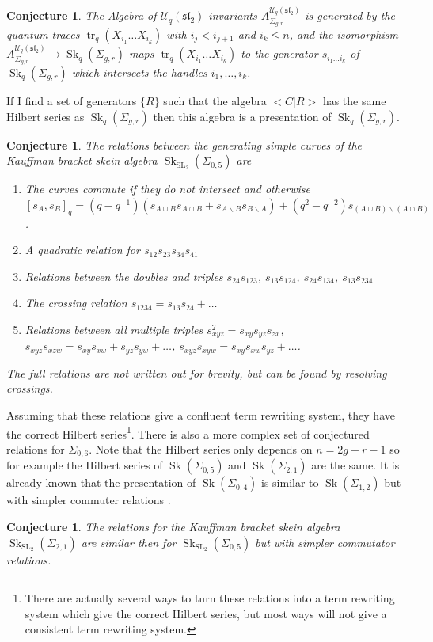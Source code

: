 \documentclass{article}
\newcommand{\Sk}{\operatorname{Sk}}
\newcommand{\SL}{\operatorname{SL}}
\newcommand{\slgroup}{\mathfrak{sl}}
\newcommand{\tr}{\operatorname{tr}_q}
\newtheorem{conj}[thm]{Conjecture}
\begin{document}
\begin{conj}
\label{conj:IsomorphismMapsTrace}
The Algebra of $\mathcal{U}_q(\slgroup_2)$-invariants $A_{\Sigma_{g,r}}^{\mathcal{U}_q(\slgroup_2)}$ is generated by the quantum traces $\tr(X_{i_1} \dots X_{i_k})$ with $i_{j} < i_{j+1}$ and $i_k \leq n$, and  the isomorphism $A_{\Sigma_{g,r}}^{\mathcal{U}_q(\slgroup_2)} \to \Sk_q(\Sigma_{g,r})$ maps $\tr(X_{i_1} \dots X_{i_k})$ to the generator $s_{i_1 \dots i_k}$ of $\Sk_q(\Sigma_{g,r})$ which intersects the handles $i_1, \dots, i_k$. 
\end{conj}

If I find a set of generators $\{R\}$ such that the algebra $< C | R>$ has the same Hilbert series as  $\Sk_q(\Sigma_{g,r})$ then this algebra is a presentation of $\Sk_q(\Sigma_{g,r})$. 

\begin{conj} The relations between the generating simple curves of the Kauffman bracket skein algebra $\Sk_{\SL_2}(\Sigma_{0,5})$ are 
\begin{enumerate}
    \item The curves commute if they do not intersect and otherwise $[s_A, s_B]_q = (q-q^{-1})(s_{A \cup B} s_{A \cap B} + s_{A \backslash B} s_{B \backslash A}) + (q^2-q^{-2})s_{(A \cup B) \backslash (A \cap B)} $.
    \item A quadratic relation for $s_{12}s_{23}s_{34}s_{41}$
    \item Relations between the doubles and triples $s_{24}s_{123}$, $s_{13} s_{124}$, $s_{24}s_{134}$, $s_{13}s_{234}$
    \item The crossing relation $s_{1234} = s_{13}s_{24} + \dots$
    \item Relations between all multiple triples $s_{xyz}^2 = s_{xy} s_{yz} s_{zx}$, $s_{xyz}s_{xzw} = s_{xy}s_{xw} + s_{yz}s_{yw} + \dots$, $s_{xyz}s_{xyw} = s_{xy}s_{xw}s_{yz} + \dots$.
\end{enumerate}
The full relations are not written out for brevity, but can be found by resolving crossings.
\end{conj}

Assuming that these relations give a confluent term rewriting system, they have the correct Hilbert series\footnote{There are actually several ways to turn these relations into a term rewriting system which give the correct Hilbert series, but most ways will not give a consistent term rewriting system.}. There is also a more complex set of conjectured relations for $\Sigma_{0,6}$.
Note that the Hilbert series only depends on $n=2g + r - 1$ so for example the Hilbert series of $\Sk(\Sigma_{0,5})$ and $\Sk(\Sigma_{2,1})$ are the same. It is already known that the presentation of $\Sk(\Sigma_{0,4})$ is similar to $\Sk(\Sigma_{1,2})$ but with simpler commuter relations \cite{BullockPrzytycki00}. 
\begin{conj}
The relations for the Kauffman bracket skein algebra $\Sk_{\SL_2}(\Sigma_{2,1})$ are similar then for $\Sk_{\SL_2}(\Sigma_{0,5})$  but with simpler commutator relations.
\end{conj}
\end{document}

